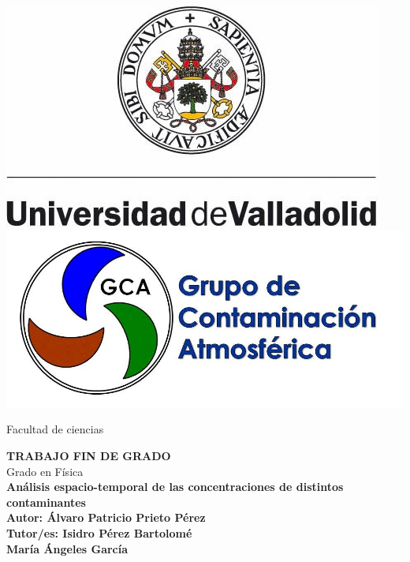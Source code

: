 \documentclass[12pt]{article}
\begin{document}
\begin{titlepage}

\begin{center}

\begin{minipage}[c]{170mm}
\includegraphics[scale=0.7]{logo_uva}
\hspace{3cm}
\includegraphics[scale=0.4]{logotipo-3-3}

\hspace{1.2cm}Facultad de ciencias
\end{minipage}

\end{center}
\begin{center}

\vspace{4cm}
\Huge \textbf{TRABAJO FIN DE GRADO} \\
\vspace{2cm}
\Large Grado en Física \\
\vspace{2cm}
{\Large \textbf{Análisis espacio-temporal de las concentraciones de distintos contaminantes}} \\
\vspace{4cm}
\normalsize \textbf{Autor: Álvaro Patricio Prieto Pérez} \\
\vspace{1cm}
\textbf{Tutor/es: Isidro Pérez Bartolomé \\ María Ángeles García}

\end{center}

\end{titlepage}
\end{document}

